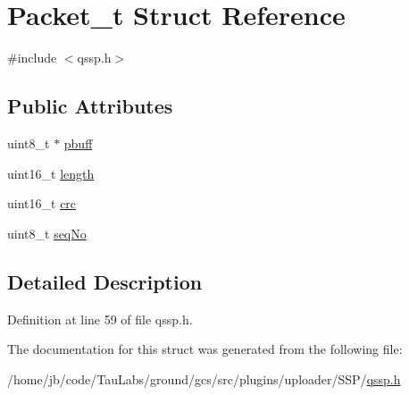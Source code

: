 \hypertarget{struct_packet__t}{\section{\-Packet\-\_\-t \-Struct \-Reference}
\label{struct_packet__t}
}


{\ttfamily \#include $<$qssp.\-h$>$}

\subsection*{\-Public \-Attributes}
\begin{DoxyCompactItemize}
\item 
uint8\-\_\-t $\ast$ \hyperlink{group___uploader_ga9e944ebc8efdc543601a3ba9ed2fa36d}{pbuff}
\item 
uint16\-\_\-t \hyperlink{group___uploader_ga0913fea37a151d66203855de5adfe013}{length}
\item 
uint16\-\_\-t \hyperlink{group___uploader_gacdbb361acbb12c670984915ffd83f70e}{crc}
\item 
uint8\-\_\-t \hyperlink{group___uploader_ga9f51d41b7233025b207d9a47188a684b}{seq\-No}
\end{DoxyCompactItemize}


\subsection{\-Detailed \-Description}


\-Definition at line 59 of file qssp.\-h.



\-The documentation for this struct was generated from the following file\-:\begin{DoxyCompactItemize}
\item 
/home/jb/code/\-Tau\-Labs/ground/gcs/src/plugins/uploader/\-S\-S\-P/\hyperlink{qssp_8h}{qssp.\-h}\end{DoxyCompactItemize}
